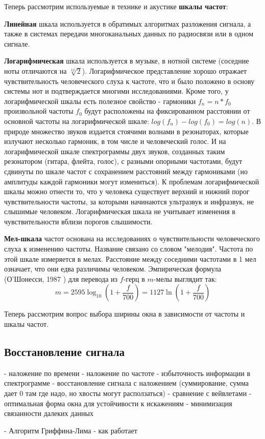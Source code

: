 Теперь рассмотрим используемые в технике и акустике \textbf{шкалы частот}:

\textbf{Линейная} шкала используется в обратимых алгоритмах разложения сигнала, а также в системах передачи многоканальных данных по радиосвязи или в одном сигнале.
  
\textbf{Логарифмическая} шкала используется в музыке, в нотной системе (соседние ноты отличаются на $\sqrt[12]{2}$). 
Логарифмическое представление хорошо отражает чувствительность человеческого слуха к частоте, что и было положено в основу системы нот и подтверждается многими исследованиями.
Кроме того, у логарифмической шкалы есть полезное свойство - гармоники $f_n = n * f_0$ произвольной частоты $f_0$ будут расположены на 
фиксированном расстоянии от основной частоты на логарифмической шкале:
$log(f_n) - log(f_0) = log(n)$. В природе множество звуков издается стоячими волнами в резонаторах, которые излучают несколько гармоник, в том числе и человеческий голос.
И на логарифмической шкале спектрограммы двух звуков, созданных таким резонатором (гитара, флейта, голос), с разными опорными частотами, 
будут сдвинуты по шкале частот с сохранением расстояний между гармониками (но амплитуды каждой гармоники могут измениться). 
К проблемам логарифмической шкалы можно отнести то, что у человека существует верхний и нижний порог чувствительности частоты, 
за которыми начинаются ультразвук и инфразвук, не слышимые человеком. 
Логарифмическая шкала не учитывает изменения в чувствительности вблизи порогов слышимости.

\textbf{Мел-шкала} \cite{MelScale} частот основана на исследованиях о чувствительности человеческого слуха к изменению частоты. Название связано со словом "мелодия".
Частота по этой шкале измеряется в мелах. Расстояние между соседними частотами в 1 мел означает, что они едва различимы человеком.
Эмпирическая формула (О'Шонесси, 1987 \cite{oshaughnessy1987speech}) для перевода из $f$-герц в $m$-мелы выглядит так:
\begin{equation}
  m = 2595 \log_{10}(1 + \frac{f}{700}) = 1127 \ln(1 + \frac{f}{700})
\end{equation}


Теперь рассмотрим вопрос выбора ширины окна в зависимости от частоты и шкалы частот.

\subsection{Восстановление сигнала}
\begin{markdown}
 - наложение по времени
 - наложение по частоте
 - избыточность информации в спектрограмме
 - восстановление сигнала с наложением (суммирование, сумма дает 0 там где надо, но хвосты могут расползаться)
 - сравнение с вейвлетами
 - оптимальная форма окна для устойчивости к искажениям
    - минимизация связанности далеких данных

 - Алгоритм Гриффина-Лима
    - как работает
\end{markdown}




